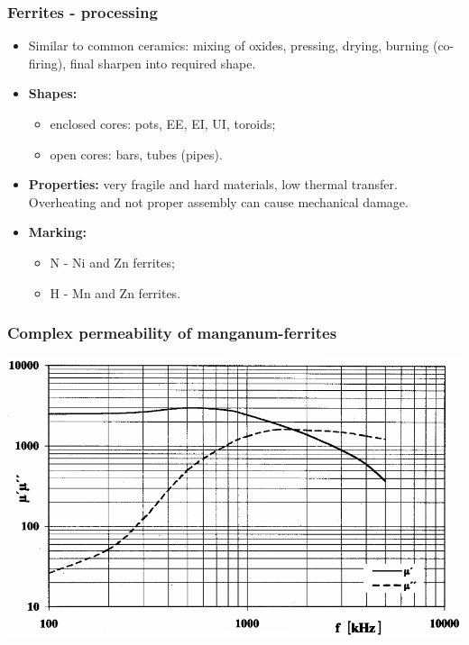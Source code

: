 \documentclass{beamer}
\begin{document}
	\begin{frame}
	\frametitle{Ferrites - processing}
	
	\begin{itemize}
		\item Similar to common ceramics: mixing of oxides, pressing, drying, burning (co-firing), final sharpen into required shape.
		\item \textbf{Shapes: }
		
		\begin{itemize}
			\item enclosed cores: pots, EE, EI, UI, toroids;
			\item open cores: bars, tubes (pipes).
		\end{itemize}
		 
		\item \textbf{Properties:} very fragile and hard materials, low thermal transfer. Overheating and not proper assembly can cause mechanical damage.
		\item \textbf{Marking:} 
		\begin{itemize}
			\item N - Ni and Zn ferrites;
			\item H - Mn and Zn ferrites.
		\end{itemize}
	\end{itemize}
  \end{frame}
	\begin{frame}
	\frametitle{Complex permeability of manganum-ferrites}
	\begin{center}
		\includegraphics[scale=0.4]{obr13_permMnFerritu.png}
	\end{center}
  \end{frame}
\end{document}

